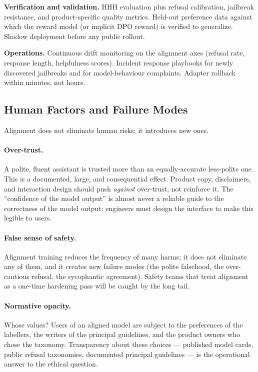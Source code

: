 \textbf{Verification and validation.}
HHH evaluation plus refusal calibration, jailbreak resistance, and
product-specific quality metrics. Held-out preference data against
which the reward model (or implicit DPO reward) is verified to
generalize. Shadow deployment before any public rollout.

\textbf{Operations.}
Continuous drift monitoring on the alignment axes (refusal rate,
response length, helpfulness scores). Incident response playbooks
for newly discovered jailbreaks and for model-behaviour complaints.
Adapter rollback within minutes, not hours.

\subsection{Human Factors and Failure Modes}

Alignment does not eliminate human risks; it introduces new ones.

\paragraph{Over-trust.}
A polite, fluent assistant is trusted more than an equally-accurate
less-polite one. This is a documented, large, and consequential
effect. Product copy, disclaimers, and interaction design should
push \emph{against} over-trust, not reinforce it. The ``confidence
of the model output'' is almost never a reliable guide to the
correctness of the model output; engineers must design the
interface to make this legible to users.

\paragraph{False sense of safety.}
Alignment training reduces the frequency of many harms; it does
not eliminate any of them, and it creates new failure modes (the
polite falsehood, the over-cautious refusal, the sycophantic
agreement). Safety teams that treat alignment as a one-time
hardening pass will be caught by the long tail.

\paragraph{Normative opacity.}
Whose values? Users of an aligned model are subject to the
preferences of the labellers, the writers of the principal
guidelines, and the product owners who chose the taxonomy.
Transparency about these choices --- published model cards, public
refusal taxonomies, documented principal guidelines --- is the
operational answer to the ethical question.

